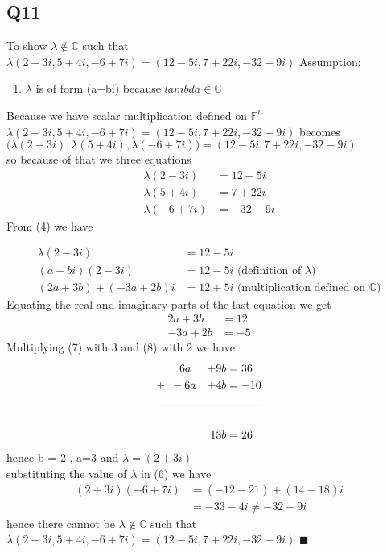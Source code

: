 \documentclass{article}
\begin{document}
\subsection*{Q11}
To show $\lambda \notin \mathbb{C}$ such that
$\lambda(2-3i,5+4i,-6+7i) = (12-5i, 7 + 22i, -32-9i) $
Assumption: 
\begin{enumerate}
\item $\lambda$ is of form (a+bi) because $ lambda \in \mathbb{C}$
\end{enumerate}
Because we have scalar multiplication defined on $\mathbb{F}^n$ \\
$\lambda(2-3i,5+4i,-6+7i) = (12-5i, 7 + 22i, -32-9i)$ becomes \\
$\Big(\lambda(2-3i),\lambda(5+4i),\lambda(-6+7i)\Big) = (12-5i, 7 + 22i,
-32-9i)$ \\
so because of that we three equations
\begin{align}
  \lambda(2-3i) &= 12 - 5i \\
  \lambda(5+4i) &= 7 + 22i \\
  \lambda(-6+7i) &= -32-9i
\end{align} 
From (4) we have

\begin{align*}
  \lambda(2-3i) &= 12 - 5i \\
  (a+bi)(2-3i) &= 12 - 5i \textrm{ (definition of $\lambda$)} \\
  (2a + 3b) + (-3a + 2b)i &= 12 + 5i \textrm{ (multiplication defined on $\mathbb{C}$)}
\end{align*}
Equating the real and imaginary parts of the last equation we get
\begin{align}
  2a + 3b &= 12 \\
 -3a + 2b &= -5
\end{align} 
Multiplying (7) with 3 and (8) with 2 we have
\begin{alignat*}{2}
  & \phantom{-}6a &+ 9b & = 36 \\
  +\hspace*{.5em} &-6a &+ 4b & = -10 \\
  \cline{1-4} \\
  && 13b&  = 26
\end{alignat*}
hence b = 2 , a=3 and $\lambda = (2 + 3i)$ \\
substituting the value of $\lambda$ in  (6) we have
\begin{align*}
  (2 + 3i)(-6 + 7i) &= (-12-21) + (14-18)i \\
   &= -33 - 4i \neq -32 + 9i 
 \end{align*}
 hence there cannot be  $\lambda \notin \mathbb{C}$ such that
 $\lambda(2-3i,5+4i,-6+7i) = (12-5i, 7 + 22i, -32-9i) $
 $\blacksquare$
\end{document}
